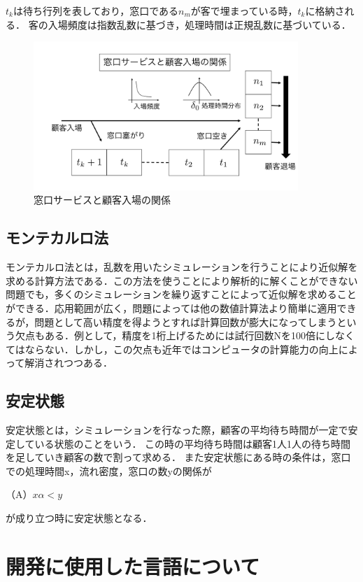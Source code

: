 \documentclass[12pt,a4j]{ltjsarticle}
\begin{document}
$t_k$は待ち行列を表しており，窓口である$n_m$が客で埋まっている時，$t_k$に格納される．
客の入場頻度は指数乱数に基づき，処理時間は正規乱数に基づいている．
\begin{figure}[h]
\begin{center}
\includegraphics[width = 100mm ] {figures/layout2.pdf}
\caption{窓口サービスと顧客入場の関係}
\end{center}
\label{fig:matigyouretu}
\end{figure}

\subsection{モンテカルロ法}
モンテカルロ法とは，乱数を用いたシミュレーションを行うことにより近似解を求める計算方法である．この方法を使うことにより解析的に解くことができない問題でも，多くのシミュレーションを繰り返すことによって近似解を求めることができる．応用範囲が広く，問題によっては他の数値計算法より簡単に適用できるが，問題として高い精度を得ようとすれば計算回数が膨大になってしまうという欠点もある．例として，精度を1桁上げるためには試行回数Nを100倍にしなくてはならない．しかし，この欠点も近年ではコンピュータの計算能力の向上によって解消されつつある．

\subsection{安定状態}
安定状態とは，シミュレーションを行なった際，顧客の平均待ち時間が一定で安定している状態のことをいう．
この時の平均待ち時間は顧客1人1人の待ち時間を足していき顧客の数で割って求める．
また安定状態にある時の条件は，窓口での処理時間x，流れ密度\alpha，窓口の数yの関係が

（A）$x\alpha < y$

\noindent
が成り立つ時に安定状態となる．
\clearpage

\section{開発に使用した言語について}
\end{document}
